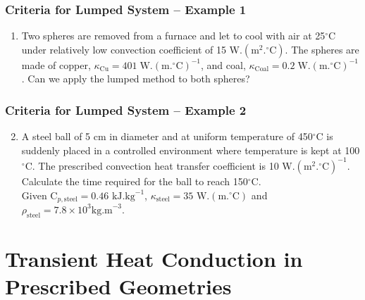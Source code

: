 \documentclass[10pt,compress,unknownkeysallowed]{beamer}
\begin{document}
\begin{frame}
 \frametitle{Criteria for Lumped System -- Example 1}
   \begin{enumerate}%
     \item<1-> Two spheres are removed from a furnace and let to cool with air at 25$^{\circ}$C under relatively low convection coefficient of 15 W.$\left(\text{m}^{2}.^{\circ}\text{C}\right)$. The spheres are made of copper,  $\kappa_{\text{Cu}}=401\;\text{W.}\left(\text{m.}^{\circ}\text{C}\right)^{-1}$, and coal, $\kappa_{\text{Coal}}=0.2\;\text{W.}\left(\text{m.}^{\circ}\text{C}\right)^{-1}$. Can we apply the lumped method to both spheres? 
   \end{enumerate}
\end{frame}

\begin{frame}
 \frametitle{Criteria for Lumped System --  Example 2}
   \begin{enumerate}\setcounter{enumi}{1}%
      \item A steel ball of 5 cm in diameter and at uniform temperature of 450$^{\circ}$C is suddenly placed in a controlled environment where temperature is kept at 100$^{\circ}$C.  The prescribed convection heat transfer coefficient is 10 W.$\left(\text{m}^{2}.^{\circ}\text{C}\right)^{-1}$. Calculate the time required for the ball to reach 150$^{\circ}$C. \\
Given C$_{p,\text{steel}} = 0.46\text{ kJ.kg}^{-1}$, $\kappa_{\text{steel}}=35\text{ W.}\left(\text{m.}^{\circ}\text{C}\right)$ and $\rho_{\text{steel}}=7.8\times 10^{3}\text{kg.m}^{-3}$.
   \end{enumerate}
\end{frame}


\section{Transient Heat Conduction in Prescribed Geometries}
\end{document}
